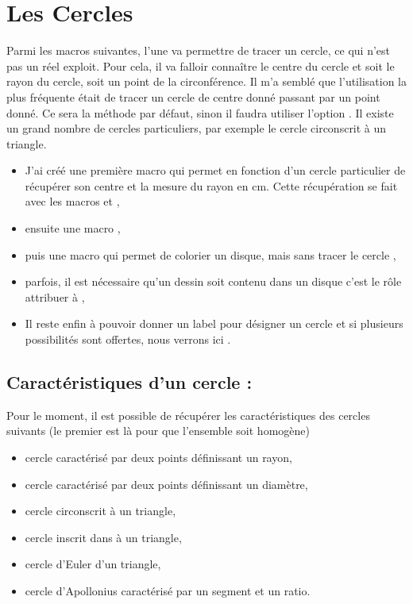 
\section{Les Cercles}

Parmi les macros suivantes, l'une  va permettre de tracer un cercle, ce qui n'est pas un réel exploit. Pour cela, il va falloir connaître le centre du cercle et soit le rayon du cercle, soit un point de la circonférence. Il m'a semblé que l'utilisation la plus fréquente était de tracer un cercle de centre donné passant par un point donné. Ce sera la méthode par défaut, sinon il faudra utiliser l'option . Il existe un grand nombre de cercles particuliers, par exemple le cercle circonscrit à un triangle.

\begin{itemize}
  \item  J'ai  créé une première macro  qui permet en fonction d'un cercle
 particulier de récupérer son centre et la mesure du rayon en cm. Cette récupération  se fait avec les macros  et ,
 
 \item ensuite une macro ,
 
 \item puis une macro qui permet de colorier un disque, mais sans tracer le cercle ,
 
 \item parfois, il est nécessaire qu'un dessin soit contenu dans un disque c'est le rôle attribuer à ,

 
 \item  Il reste enfin à pouvoir donner un label pour désigner un cercle et si plusieurs possibilités sont offertes, nous verrons ici .
\end{itemize}
 

\subsection{Caractéristiques d'un cercle : }
 
Pour le moment, il est possible de récupérer les caractéristiques des cercles suivants (le premier est là pour que l'ensemble soit homogène)
\begin{itemize}
\item  {}  cercle caractérisé par deux points définissant un rayon,
\item  {}  cercle caractérisé par  deux points définissant un diamètre,
\item {} cercle circonscrit à un triangle,
\item {} cercle inscrit dans à un triangle,
\item {} cercle d'Euler d'un triangle,
\item {} cercle d'Apollonius caractérisé par un segment et un ratio.  
\end{itemize}   

